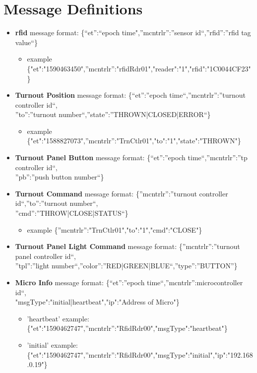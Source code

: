 \section{Message Definitions}
\begin{itemize}
\item \textbf {\gls{rfid}} message format: \{“et”:“epoch time",”mcntrlr”:”sensor id“,”rfid”:”rfid tag value“\}
\begin{itemize}
\item example \{"et":"1590463450",”mcntrlr”:"rfidRdr01","reader":"1","rfid":"1C0044CF23"\}
\end{itemize}
\item \textbf {Turnout Position} message format: \{“et”:”epoch time“,”mcntrlr”:”turnout controller id“, \\”to”:”turnout number“,”state”:”THROWN|CLOSED|ERROR“\}
\begin{itemize}
\item example \{"et":"1588827073",”mcntrlr”:"TrnCtlr01","to":"1","state":"THROWN"\}
\end{itemize}
\item \textbf {Turnout Panel Button} message format: \{“et”:”epoch time“,”mcntrlr”:”tp controller id“, \\”pb”:”push button number“\} 
\item \textbf {Turnout Command} message format: \{”mcntrlr”:”turnout controller id“,”to”:”turnout number“, \\”cmd”:”THROW|CLOSE|STATUS“\}
\begin{itemize}
\item example \{”mcntrlr”:"TrnCtlr01","to":"1","cmd":"CLOSE"\}
\end{itemize}
\item \textbf {Turnout Panel Light Command} message format: \{”mcntrlr”:”turnout panel controller id“, \\”tpl”:”light number“,”color”:”RED|GREEN|BLUE“,”type”:”BUTTON”\}
\item \textbf {Micro Info} message format: \{“et”:”epoch time“,”mcntrlr”:microcontroller id“, \\"msgType":"initial|heartbeat","ip":"Address of Micro"\}
\begin{itemize}
\item 'heartbeat' example: \{"et":"1590462747",”mcntrlr”:"RfidRdr00","msgType":"heartbeat"\} 
\item 'initial' example: \{"et":"1590462747",”mcntrlr”:"RfidRdr00","msgType":"initial","ip":"192.168.0.19"\}
\end{itemize}
\end{itemize}
